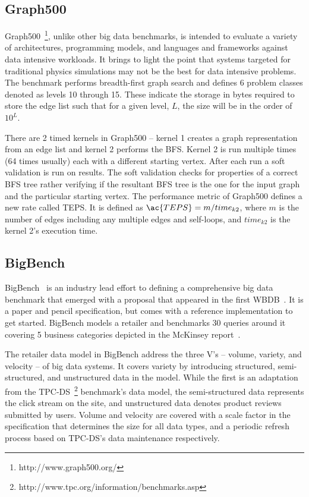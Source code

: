 \subsection{Graph500}
Graph500~\footnote{http://www.graph500.org/}, unlike other big data benchmarks, is intended to evaluate a variety of architectures, programming models, and languages and frameworks against data intensive workloads. It brings to light the point that systems targeted for traditional physics simulations may not be the best for data intensive problems. The benchmark performs breadth-first graph search and defines 6 problem classes denoted as levels 10 through 15.  These indicate the storage in bytes required to store the edge list such that for a given level, $L$, the size will be in the order of $10^L$. 

There are 2 timed kernels in Graph500 – kernel 1 creates a graph representation from an edge list and kernel 2 performs the \ac{BFS}. Kernel 2 is run multiple times (64 times usually) each with a different starting vertex. After each run a soft validation is run on results. The soft validation checks for properties of a correct \ac{BFS} tree rather verifying if the resultant \ac{BFS} tree is the one for the input graph and the particular starting vertex. The performance metric of Graph500 defines a new rate called \ac{TEPS}. It is defined as $\ac{TEPS}=m/time_{k2}$, where $m$ is the number of edges including any multiple edges and self-loops, and $time_{k2}$ is the kernel 2’s execution time. 

\subsection{BigBench}
BigBench~\cite{bigbench, bigbench.site} is an industry lead effort to defining a comprehensive big data benchmark that emerged with a proposal that appeared in the first \ac{WBDB}~\cite{wbdb}. It is a paper and pencil specification, but comes with a reference implementation to get started. BigBench models a retailer and benchmarks 30 queries around it covering 5 business categories depicted in the McKinsey report~\cite{mckinsey}. 

The retailer data model in BigBench address the three V’s – volume, variety, and velocity – of big data systems. It covers variety by introducing structured, semi-structured, and unstructured data in the model. While the first is an adaptation from the TPC-DS~\footnote{http://www.tpc.org/information/benchmarks.asp} benchmark’s data model, the semi-structured data represents the click stream on the site, and unstructured data denotes product reviews submitted by users. Volume and velocity are covered with a scale factor in the specification that determines the size for all data types, and a periodic refresh process based on TPC-DS’s data maintenance respectively. 

